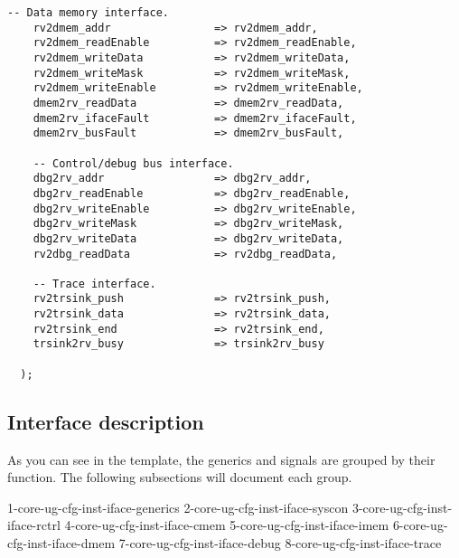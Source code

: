 \begin{lstlisting}[numbers=none, basicstyle=\tiny]
    -- Data memory interface.
    rv2dmem_addr                => rv2dmem_addr,
    rv2dmem_readEnable          => rv2dmem_readEnable,
    rv2dmem_writeData           => rv2dmem_writeData,
    rv2dmem_writeMask           => rv2dmem_writeMask,
    rv2dmem_writeEnable         => rv2dmem_writeEnable,
    dmem2rv_readData            => dmem2rv_readData,
    dmem2rv_ifaceFault          => dmem2rv_ifaceFault,
    dmem2rv_busFault            => dmem2rv_busFault,
    
    -- Control/debug bus interface.
    dbg2rv_addr                 => dbg2rv_addr,
    dbg2rv_readEnable           => dbg2rv_readEnable,
    dbg2rv_writeEnable          => dbg2rv_writeEnable,
    dbg2rv_writeMask            => dbg2rv_writeMask,
    dbg2rv_writeData            => dbg2rv_writeData,
    rv2dbg_readData             => rv2dbg_readData,
    
    -- Trace interface.
    rv2trsink_push              => rv2trsink_push,
    rv2trsink_data              => rv2trsink_data,
    rv2trsink_end               => rv2trsink_end,
    trsink2rv_busy              => trsink2rv_busy
    
  );

\end{lstlisting}

\subsection{Interface description}
\label{sec:core-ug-inst-iface}

As you can see in the template, the generics and signals are grouped by their 
function. The following subsections will document each group.

{1-core-ug-cfg-inst-iface-generics}
{2-core-ug-cfg-inst-iface-syscon}
{3-core-ug-cfg-inst-iface-rctrl}
{4-core-ug-cfg-inst-iface-cmem}
{5-core-ug-cfg-inst-iface-imem}
{6-core-ug-cfg-inst-iface-dmem}
{7-core-ug-cfg-inst-iface-debug}
{8-core-ug-cfg-inst-iface-trace}


